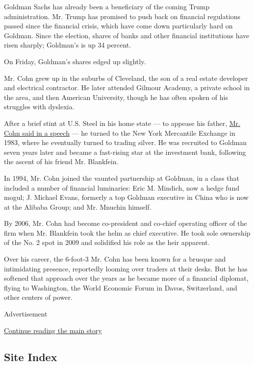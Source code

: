 Goldman Sachs has already been a beneficiary of the coming Trump
administration. Mr. Trump has promised to push back on financial
regulations passed since the financial crisis, which have come down
particularly hard on Goldman. Since the election, shares of banks and
other financial institutions have risen sharply; Goldman's is up 34
percent.

On Friday, Goldman's shares edged up slightly.

Mr. Cohn grew up in the suburbs of Cleveland, the son of a real estate
developer and electrical contractor. He later attended Gilmour Academy,
a private school in the area, and then American University, though he
has often spoken of his struggles with dyslexia.

After a brief stint at U.S. Steel in his home state --- to appease his
father,
\href{http://www.american.edu/media/20090510_Kogod_School_of_Business_Speaker.cfm}{Mr.
Cohn said in a speech} --- he turned to the New York Mercantile Exchange
in 1983, where he eventually turned to trading silver. He was recruited
to Goldman seven years later and became a fast-rising star at the
investment bank, following the ascent of his friend Mr. Blankfein.

In 1994, Mr. Cohn joined the vaunted partnership at Goldman, in a class
that included a number of financial luminaries: Eric M. Mindich, now a
hedge fund mogul; J. Michael Evans, formerly a top Goldman executive in
China who is now at the Alibaba Group; and Mr. Mnuchin himself.

By 2006, Mr. Cohn had become co-president and co-chief operating officer
of the firm when Mr. Blankfein took the helm as chief executive. He took
sole ownership of the No. 2 spot in 2009 and solidified his role as the
heir apparent.

Over his career, the 6-foot-3 Mr. Cohn has been known for a brusque and
intimidating presence, reportedly looming over traders at their desks.
But he has softened that approach over the years as he became more of a
financial diplomat, flying to Washington, the World Economic Forum in
Davos, Switzerland, and other centers of power.

Advertisement

\protect\hyperlink{after-bottom}{Continue reading the main story}

\hypertarget{site-index}{%
\subsection{Site Index}\label{site-index}}

